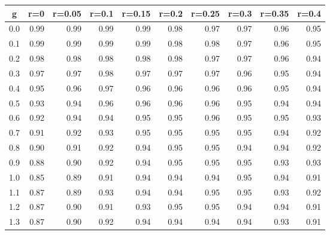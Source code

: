 %
\begin{table}[!tbp]
 \begin{center}
 \begin{tabular}{rrrrrrrrrr}\hline\hline
\multicolumn{1}{c}{g}&\multicolumn{1}{c}{r=0}&\multicolumn{1}{c}{r=0.05}&\multicolumn{1}{c}{r=0.1}&\multicolumn{1}{c}{r=0.15}&\multicolumn{1}{c}{r=0.2}&\multicolumn{1}{c}{r=0.25}&\multicolumn{1}{c}{r=0.3}&\multicolumn{1}{c}{r=0.35}&\multicolumn{1}{c}{r=0.4}\tabularnewline
\hline
0.0&0.99&0.99&0.99&0.99&0.98&0.97&0.97&0.96&0.95\tabularnewline
0.1&0.99&0.99&0.99&0.99&0.98&0.98&0.97&0.96&0.95\tabularnewline
0.2&0.98&0.98&0.98&0.98&0.98&0.97&0.97&0.96&0.94\tabularnewline
0.3&0.97&0.97&0.98&0.97&0.97&0.97&0.96&0.95&0.94\tabularnewline
0.4&0.95&0.96&0.97&0.96&0.96&0.96&0.96&0.95&0.94\tabularnewline
0.5&0.93&0.94&0.96&0.96&0.96&0.96&0.95&0.94&0.94\tabularnewline
0.6&0.92&0.94&0.94&0.95&0.95&0.96&0.95&0.95&0.93\tabularnewline
0.7&0.91&0.92&0.93&0.95&0.95&0.95&0.95&0.94&0.92\tabularnewline
0.8&0.90&0.91&0.92&0.94&0.95&0.95&0.94&0.94&0.92\tabularnewline
0.9&0.88&0.90&0.92&0.94&0.95&0.95&0.95&0.93&0.93\tabularnewline
1.0&0.85&0.89&0.91&0.94&0.94&0.94&0.95&0.94&0.91\tabularnewline
1.1&0.87&0.89&0.93&0.94&0.94&0.95&0.95&0.93&0.92\tabularnewline
1.2&0.87&0.90&0.91&0.93&0.95&0.95&0.94&0.94&0.91\tabularnewline
1.3&0.87&0.90&0.92&0.94&0.94&0.94&0.94&0.93&0.91\tabularnewline
\hline
\end{tabular}

\end{center}

\end{table}


